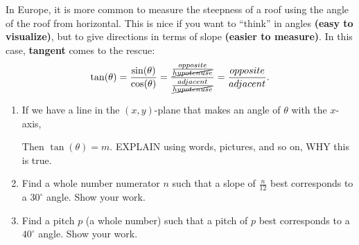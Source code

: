 \documentclass[noauthor,nooutcomes,hints,handout]{ximera}
\begin{document}
\begin{question}
In Europe, it is more common to measure the steepness of a roof using
the angle of the roof from horizontal. This is nice if you want to
``think'' in angles \textbf{(easy to visualize)}, but to give directions
in terms of slope \textbf{(easier to measure)}. In this case,
\textbf{tangent} comes to the rescue:
\[
\tan(\theta) = \frac{\sin(\theta)}{\cos(\theta)} = \frac{\frac{opposite}{\cancel{hypotenuse}}}{\frac{adjacent}{\cancel{hypotenuse}}}=\frac{opposite}{adjacent}.
\]



\begin{enumerate}
\item If we have a line in the $(x,y)$-plane that makes an angle of
  $\theta$ with the $x$-axis,
  \begin{center}
  \end{center}
  Then $\tan(\theta) = m$. EXPLAIN using words, pictures, and so on,
  WHY this is true.
\item Find a whole number numerator $n$ such that a slope of
  $\frac{n}{12}$ best corresponds to a $30^\circ$ angle. Show your
  work.
\item Find a pitch $p$ (a whole number) such that a pitch of $p$ best
  corresponds to a $40^\circ$ angle. Show your work.


\end{enumerate}
\end{question}
\end{document}
